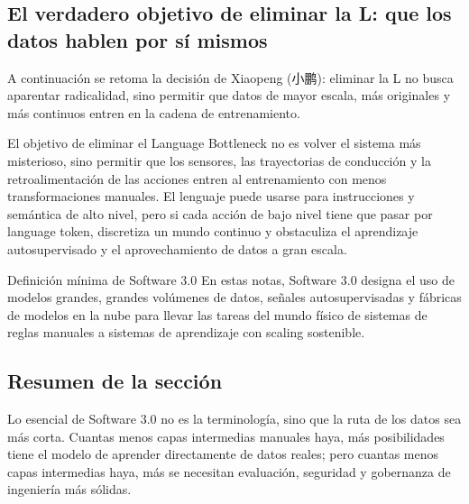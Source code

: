 \subsection{El verdadero objetivo de eliminar la L: que los datos hablen por sí mismos}

A continuación se retoma la decisión de Xiaopeng (小鹏): eliminar la L no busca aparentar radicalidad, sino permitir que datos de mayor escala, más originales y más continuos entren en la cadena de entrenamiento.

El objetivo de eliminar el Language Bottleneck no es volver el sistema más misterioso, sino permitir que los sensores, las trayectorias de conducción y la retroalimentación de las acciones entren al entrenamiento con menos transformaciones manuales. El lenguaje puede usarse para instrucciones y semántica de alto nivel, pero si cada acción de bajo nivel tiene que pasar por language token, discretiza un mundo continuo y obstaculiza el aprendizaje autosupervisado y el aprovechamiento de datos a gran escala.

\begin{importantbox}{Definición mínima de Software 3.0}
En estas notas, Software 3.0 designa el uso de modelos grandes, grandes volúmenes de datos, señales autosupervisadas y fábricas de modelos en la nube para llevar las tareas del mundo físico de sistemas de reglas manuales a sistemas de aprendizaje con scaling sostenible.
\end{importantbox}

\subsection{Resumen de la sección}

Lo esencial de Software 3.0 no es la terminología, sino que la ruta de los datos sea más corta. Cuantas menos capas intermedias manuales haya, más posibilidades tiene el modelo de aprender directamente de datos reales; pero cuantas menos capas intermedias haya, más se necesitan evaluación, seguridad y gobernanza de ingeniería más sólidas.
